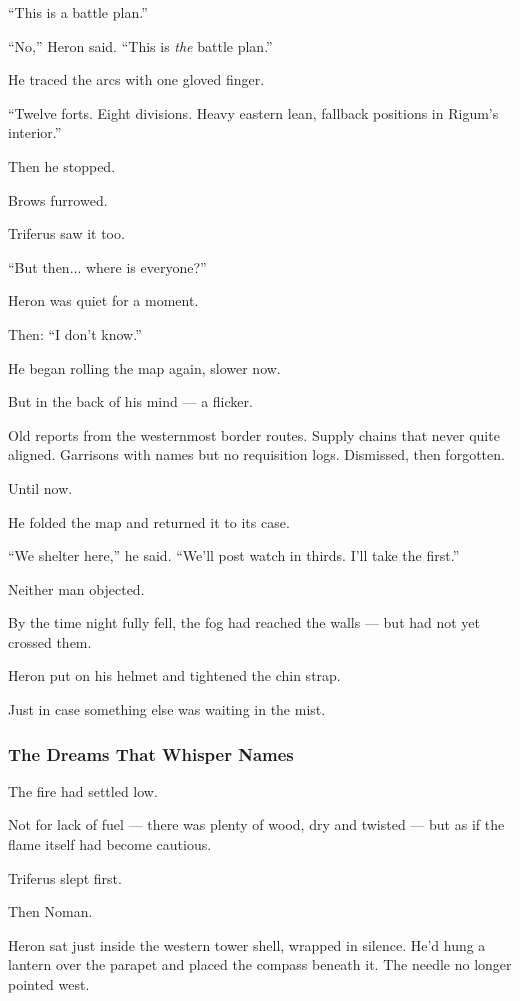 \documentclass[12pt]{article}
\begin{document}
“This is a battle plan.”

“No,” Heron said. “This is \textit{the} battle plan.”

He traced the arcs with one gloved finger.

“Twelve forts. Eight divisions. Heavy eastern lean, fallback positions in Rigum’s interior.”

Then he stopped.

Brows furrowed.

Triferus saw it too.

“But then... where is everyone?”

Heron was quiet for a moment.

Then: “I don’t know.”

He began rolling the map again, slower now.

But in the back of his mind — a flicker.

Old reports from the westernmost border routes. Supply chains that never quite aligned. Garrisons with names but no requisition logs. Dismissed, then forgotten.

Until now.

He folded the map and returned it to its case.

“We shelter here,” he said. “We’ll post watch in thirds. I’ll take the first.”

Neither man objected.

By the time night fully fell, the fog had reached the walls — but had not yet crossed them.

Heron put on his helmet and tightened the chin strap.

Just in case something else was waiting in the mist.

\dotfill

\subsubsection{The Dreams That Whisper Names}

The fire had settled low.

Not for lack of fuel — there was plenty of wood, dry and twisted — but as if the flame itself had become cautious.

Triferus slept first.

Then Noman.

Heron sat just inside the western tower shell, wrapped in silence. He’d hung a lantern over the parapet and placed the compass beneath it. The needle no longer pointed west.
\end{document}
